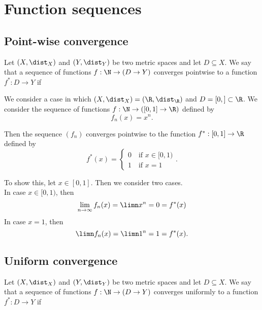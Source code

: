 \section{Function sequences}

\subsection{Point-wise convergence}
\begin{definition}
    Let $(X, \dist_X)$ and $(Y,\dist_Y)$ be two metric spaces and let $D \subseteq X$.
    We say that a sequence of functions $f: \N \to (D \to Y)$ converges pointwise to
    a function $f^*:D \to Y$ if
    \begin{myCenter}
    \end{myCenter}
\end{definition}

\begin{example}
    We consider a case in which $(X, \dist_X) = (\R, \dist_\R)$ and $D = [0,] \subset \R$.
    We consider the sequence of functions $f: \N \to ([0,1] \to \R)$ defined by
    $$f_n(x) = x^n.$$

    Then the sequence $(f_n)$ converges pointwise to the function $f^*:[0,1] \to \R$ defined by
    $$f^*(x) = \begin{cases}0 \quad\text{if }x \in [0,1) \\ 1 \quad\text{if }x = 1\end{cases}.$$

    To show this, let $x \in [0,1]$. Then we consider two cases.\\
    In case $x \in [0,1)$, then
    $$\lim_{n\to\infty}f_n(x) = \limn x^n = 0 = f^*(x) \hfill$$
    In case $x = 1$, then
    $$\limn f_n(x) = \limn 1^n = 1 = f^*(x).$$
\end{example}

\subsection{Uniform convergence}
\begin{definition}
    Let $(X, \dist_X)$ and $(Y,\dist_Y)$ be two metric spaces and let $D \subseteq X$. We say
    that a sequence of functions $f:\N \to (D \to Y)$ converges uniformly to a function $f^*:D \to Y$ if
    \begin{myCenter}
    \end{myCenter}
\end{definition}

